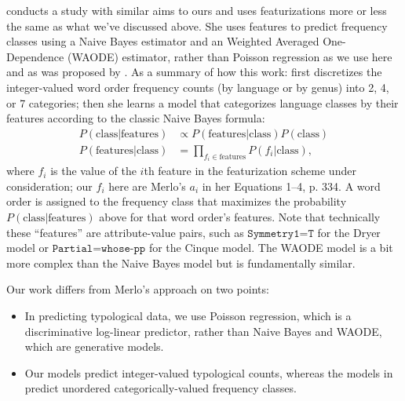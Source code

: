 \documentclass[11pt]{article}
\begin{document}
\citet{merlo2015predicting} conducts a study with similar aims to ours and uses featurizations more or less the same as what we've discussed above.
She uses features to predict frequency classes using a Naive Bayes estimator and an Weighted Averaged One-Dependence (WAODE) estimator, rather than Poisson regression as we use here and as was proposed by \citet{cysouw2010dealing}.
As a summary of how this work: \citet{merlo2015predicting} first discretizes the integer-valued word order frequency counts (by language or by genus) into 2, 4, or 7 categories; then she learns a model that categorizes language classes by their features according to the classic Naive Bayes formula:
\begin{align*}
  \nonumber
  P(\text{class}|\text{features}) &\propto P(\text{features}|\text{class}) P(\text{class}) \\
  \nonumber
  P(\text{features}|\text{class}) &= \prod_{f_i \in \text{features}} P(f_i | \text{class}),
\end{align*}
where $f_i$ is the value of the $i$th feature in the featurization scheme under consideration; our $f_i$ here are Merlo's $a_i$ in her Equations 1--4, p. 334. A word order is assigned to the frequency class that maximizes the probability $P(\text{class}|\text{features})$ above for that word order's features.
Note that technically these ``features'' are attribute-value pairs, such as $\texttt{Symmetry1=T}$ for the Dryer model or $\texttt{Partial=whose-pp}$ for the Cinque model.
The WAODE model is a bit more complex than the Naive Bayes model but is fundamentally similar.

Our work differs from Merlo's approach on two points:
\begin{itemize}
\item In predicting typological data, we use Poisson regression, which is a discriminative log-linear predictor, rather than Naive Bayes and WAODE, which are generative models.
\item Our models predict integer-valued typological counts, whereas the models in \citet{merlo2015predicting} predict unordered categorically-valued frequency classes.
\end{itemize}
\end{document}
